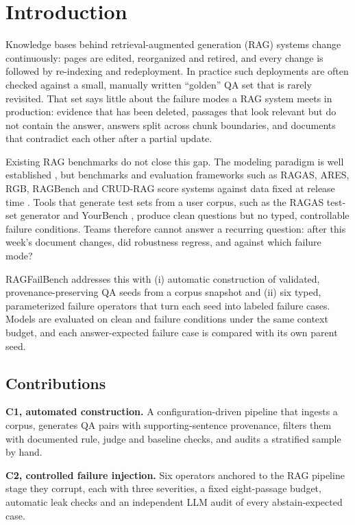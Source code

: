 \documentclass[conference]{IEEEtran}
\begin{document}
\section{Introduction}
Knowledge bases behind retrieval-augmented generation (RAG) systems change continuously: pages
are edited, reorganized and retired, and every change is followed by re-indexing and
redeployment. In practice such deployments are often checked against a small, manually written
``golden'' QA set that is rarely revisited. That set says little about the failure modes a RAG
system meets in production: evidence that has been deleted, passages that look relevant but do
not contain the answer, answers split across chunk boundaries, and documents that contradict
each other after a partial update.

Existing RAG benchmarks do not close this gap. The modeling paradigm is well established
\cite{lewis2020rag,gao2023survey,zhao2024survey,huang2024survey}, but benchmarks and evaluation
frameworks such as RAGAS, ARES, RGB, RAGBench and CRUD-RAG score systems against data fixed at
release time \cite{es2024ragas,saadfalcon2024ares,chen2024rgb,friel2024ragbench,lyu2024crud}.
Tools that generate test sets from a user corpus, such as the RAGAS test-set generator and
YourBench \cite{es2024ragas,shashidhar2025yourbench}, produce clean questions but no typed,
controllable failure conditions. Teams therefore cannot answer a recurring question: after this
week's document changes, did robustness regress, and against which failure mode?

RAGFailBench addresses this with (i) automatic construction of validated,
provenance-preserving QA seeds from a corpus snapshot and (ii) six typed, parameterized failure
operators that turn each seed into labeled failure cases. Models are evaluated on clean and
failure conditions under the same context budget, and each answer-expected failure case is
compared with its own parent seed.

\subsection{Contributions}
\textbf{C1, automated construction.} A configuration-driven pipeline that ingests a corpus,
generates QA pairs with supporting-sentence provenance, filters them with documented rule,
judge and baseline checks, and audits a stratified sample by hand.

\textbf{C2, controlled failure injection.} Six operators anchored to the RAG pipeline stage they
corrupt, each with three severities, a fixed eight-passage budget, automatic leak checks and an
independent LLM audit of every abstain-expected case.
\end{document}
